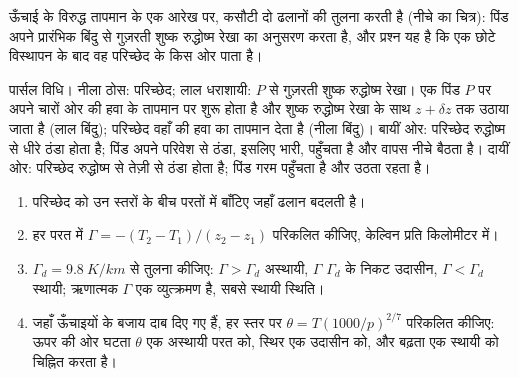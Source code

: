 ऊँचाई के विरुद्ध तापमान के एक आरेख पर, कसौटी दो ढलानों की तुलना करती है (नीचे का चित्र): पिंड अपने प्रारंभिक बिंदु से गुज़रती शुष्क रुद्धोष्म रेखा का अनुसरण करता है, और प्रश्न यह है कि एक छोटे विस्थापन के बाद वह परिच्छेद के किस ओर पाता है।

\begin{omfigure}

{\small पार्सल विधि। नीला ठोस: परिच्छेद; लाल धराशायी: $P$ से गुज़रती शुष्क रुद्धोष्म रेखा। एक पिंड $P$ पर अपने चारों ओर की हवा के तापमान पर शुरू होता है और शुष्क रुद्धोष्म रेखा के साथ $z + \delta z$ तक उठाया जाता है (लाल बिंदु); परिच्छेद वहाँ की हवा का तापमान देता है (नीला बिंदु)। बायीं ओर: परिच्छेद रुद्धोष्म से धीरे ठंडा होता है; पिंड अपने परिवेश से ठंडा, इसलिए भारी, पहुँचता है और वापस नीचे बैठता है। दायीं ओर: परिच्छेद रुद्धोष्म से तेज़ी से ठंडा होता है; पिंड गरम पहुँचता है और उठता रहता है।}
\label{fig:b1:fluid-envelopes-structure:parcel}
\end{omfigure}

\begin{method}[परिच्छेद की स्थिरता पढ़ना]\label{met:b1:fluid-envelopes-structure:sounding}
\begin{enumerate}
  \item परिच्छेद को उन स्तरों के बीच परतों में बाँटिए जहाँ ढलान बदलती है।
  \item हर परत में $\Gamma = -(T_2 - T_1)/(z_2 - z_1)$ परिकलित कीजिए, केल्विन प्रति किलोमीटर में।
  \item $\Gamma_d = \qty{9.8}{K/km}$ से तुलना कीजिए: $\Gamma > \Gamma_d$ अस्थायी, $\Gamma$ $\Gamma_d$ के निकट उदासीन, $\Gamma < \Gamma_d$ स्थायी; ऋणात्मक $\Gamma$ एक व्युत्क्रमण है, सबसे स्थायी स्थिति।
  \item जहाँ ऊँचाइयों के बजाय दाब दिए गए हैं, हर स्तर पर $\theta =
        T(1000/p)^{2/7}$ परिकलित कीजिए: ऊपर की ओर घटता $\theta$ एक अस्थायी परत को, स्थिर एक उदासीन को, और बढ़ता एक स्थायी को चिह्नित करता है।
\end{enumerate}
\end{method}

